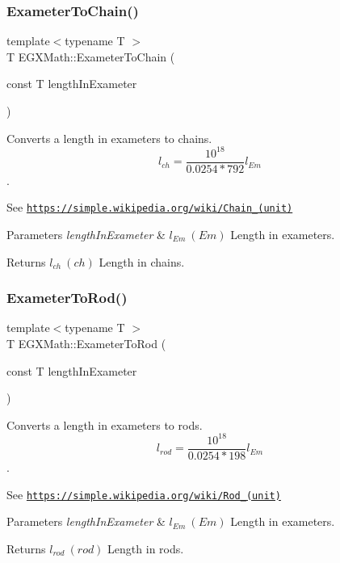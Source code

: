 \subsubsection{\texorpdfstring{Exameter\+To\+Chain()}{ExameterToChain()}}
{\footnotesize\ttfamily template$<$typename T $>$ \\
T E\+G\+X\+Math\+::\+Exameter\+To\+Chain (\begin{DoxyParamCaption}\item[{const T}]{length\+In\+Exameter }\end{DoxyParamCaption})}



Converts a length in exameters to chains. \[ l_{ch}= \frac{10^{18}}{0.0254 * 792} l_{Em} \]. 

See \href{https://simple.wikipedia.org/wiki/Chain_(unit)}{\tt https\+://simple.\+wikipedia.\+org/wiki/\+Chain\+\_\+(unit)} 
\begin{DoxyParams}{Parameters}
{\em length\+In\+Exameter} & $ l_{Em}\ (Em)$ Length in exameters. \\
\hline
\end{DoxyParams}
\begin{DoxyReturn}{Returns}
$ l_{ch}\ (ch)$ Length in chains. 
\end{DoxyReturn}
\mbox{\label{group___e_g_x_math-_conversions-_length_conversions-_s_i-_exameter-_surveyors_ga5d842e19237d7aecc7d5c2428e4ac434}} 
\subsubsection{\texorpdfstring{Exameter\+To\+Rod()}{ExameterToRod()}}
{\footnotesize\ttfamily template$<$typename T $>$ \\
T E\+G\+X\+Math\+::\+Exameter\+To\+Rod (\begin{DoxyParamCaption}\item[{const T}]{length\+In\+Exameter }\end{DoxyParamCaption})}



Converts a length in exameters to rods. \[ l_{rod}= \frac{10^{18}}{0.0254 * 198} l_{Em} \]. 

See \href{https://simple.wikipedia.org/wiki/Rod_(unit)}{\tt https\+://simple.\+wikipedia.\+org/wiki/\+Rod\+\_\+(unit)} 
\begin{DoxyParams}{Parameters}
{\em length\+In\+Exameter} & $ l_{Em}\ (Em)$ Length in exameters. \\
\hline
\end{DoxyParams}
\begin{DoxyReturn}{Returns}
$ l_{rod}\ (rod)$ Length in rods. 
\end{DoxyReturn}
